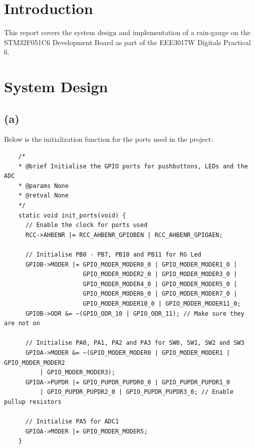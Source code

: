 \section{Introduction}
\label{sec:Introduction}
This report covers the system design and implementation of a rain-gauge on the STM32F051C6 Development Board as part of the EEE3017W Digitals Practical 6.

\section*{System Design}
\label{sec:System Design}
\subsection*{(a)}
\label{sub:(a)}
Below is the initialization function for the ports used in the project: \\
\begin{mdframed}[linecolor=black, topline=false, bottomline=false,
  leftline=false, rightline=false, userdefinedwidth=\textwidth]
  \begin{verbatim}
    /*
    * @brief Initialise the GPIO ports for pushbuttons, LEDs and the ADC
    * @params None
    * @retval None
    */
    static void init_ports(void) {
      // Enable the clock for ports used
      RCC->AHBENR |= RCC_AHBENR_GPIOBEN | RCC_AHBENR_GPIOAEN;

      // Initialise PB0 - PB7, PB10 and PB11 for RG Led
      GPIOB->MODER |= GPIO_MODER_MODER0_0 | GPIO_MODER_MODER1_0 |
                      GPIO_MODER_MODER2_0 | GPIO_MODER_MODER3_0 |
                      GPIO_MODER_MODER4_0 | GPIO_MODER_MODER5_0 |
                      GPIO_MODER_MODER6_0 | GPIO_MODER_MODER7_0 |
                      GPIO_MODER_MODER10_0 | GPIO_MODER_MODER11_0;
      GPIOB->ODR &= ~(GPIO_ODR_10 | GPIO_ODR_11); // Make sure they are not on

      // Initialise PA0, PA1, PA2 and PA3 for SW0, SW1, SW2 and SW3
      GPIOA->MODER &= ~(GPIO_MODER_MODER0 | GPIO_MODER_MODER1 | GPIO_MODER_MODER2
          | GPIO_MODER_MODER3);
      GPIOA->PUPDR |= GPIO_PUPDR_PUPDR0_0 | GPIO_PUPDR_PUPDR1_0
          | GPIO_PUPDR_PUPDR2_0 | GPIO_PUPDR_PUPDR3_0; // Enable pullup resistors

      // Initialise PA5 for ADC1
      GPIOA->MODER |= GPIO_MODER_MODER5;
    }
  \end{verbatim}
\end{mdframed}
\vspace{0.5cm}

